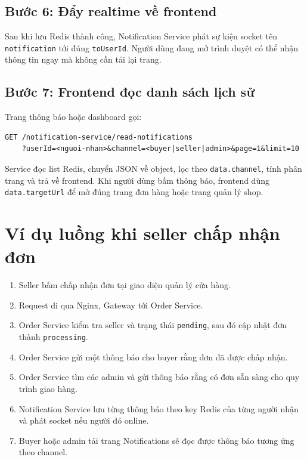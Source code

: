 \documentclass[12pt]{article}
\begin{document}
\subsection{Bước 6: Đẩy realtime về frontend}
Sau khi lưu Redis thành công, Notification Service phát sự kiện socket tên \texttt{notification} tới đúng \texttt{toUserId}. Người dùng đang mở trình duyệt có thể nhận thông tin ngay mà không cần tải lại trang.

\subsection{Bước 7: Frontend đọc danh sách lịch sử}
Trang thông báo hoặc dashboard gọi:
\begin{verbatim}
GET /notification-service/read-notifications
    ?userId=<nguoi-nhan>&channel=<buyer|seller|admin>&page=1&limit=10
\end{verbatim}
Service đọc list Redis, chuyển JSON về object, lọc theo \texttt{data.channel}, tính phân trang và trả về frontend. Khi người dùng bấm thông báo, frontend dùng \texttt{data.targetUrl} để mở đúng trang đơn hàng hoặc trang quản lý shop.

\section{Ví dụ luồng khi seller chấp nhận đơn}
\begin{enumerate}
  \item Seller bấm chấp nhận đơn tại giao diện quản lý cửa hàng.
  \item Request đi qua Nginx, Gateway tới Order Service.
  \item Order Service kiểm tra seller và trạng thái \texttt{pending}, sau đó cập nhật đơn thành \texttt{processing}.
  \item Order Service gửi một thông báo cho buyer rằng đơn đã được chấp nhận.
  \item Order Service tìm các admin và gửi thông báo rằng có đơn sẵn sàng cho quy trình giao hàng.
  \item Notification Service lưu từng thông báo theo key Redis của từng người nhận và phát socket nếu người đó online.
  \item Buyer hoặc admin tải trang Notifications sẽ đọc được thông báo tương ứng theo channel.
\end{enumerate}
\end{document}
